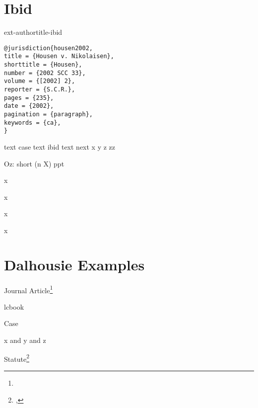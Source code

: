 



\section{Ibid}
ext-authortitle-ibid

\begin{verbatim}
@jurisdiction{housen2002,
title = {Housen v. Nikolaisen},
shorttitle = {Housen},
number = {2002 SCC 33},
volume = {[2002] 2},
reporter = {S.C.R.},
pages = {235},
date = {2002},
pagination = {paragraph},
keywords = {ca},
}

\end{verbatim}


text case text ibid text next
x
y
z
zz

{
\lcsetstyleaglc

Oz: short (n X) ppt

x

x

x

x

}



\section{Dalhousie Examples}

Journal Article\footnote{}

lcbook

Case

x and y
 and z
 
Statute\footnote{, } 

